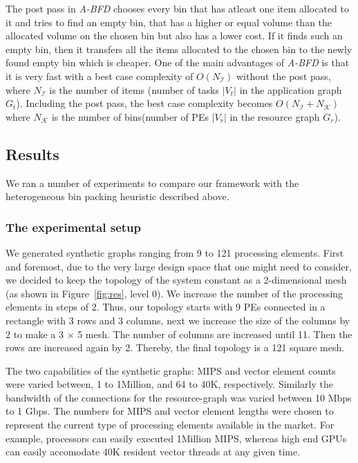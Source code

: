 The post pass in \textit{A-BFD} chooses every bin that has atleast one
item allocated to it and tries to find an empty bin, that has a higher
or equal volume than the allocated volume on the chosen bin but also has
a lower cost. If it finds such an empty bin, then it transfers all the
items allocated to the chosen bin to the newly found empty bin which is
cheaper. One of the main advantages of \textit{A-BFD} is that it is very
fast with a best case complexity of $O(N_\mathcal{I})$ without the post
pass, where $N_\mathcal{I}$ is the number of items (number of tasks
$|V_t|$ in the application graph $G_t$). Including the post pass, the
best case complexity becomes $O(N_\mathcal{I} + N_\mathcal{K})$ where
$N_\mathcal{K}$ is the number of bins(number of PEs $|V_r|$ in the
resource graph $G_r$).


\subsection{Results}
\label{sec:results}

We ran a number of experiments to compare our framework with the
heterogeneous bin packing heuristic described above.

\subsubsection{The experimental setup}
\label{sec:experimental-setup}

We generated synthetic graphs ranging from 9 to 121 processing
elements. First and foremost, due to the very large design space that
one might need to consider, we decided to keep the topology of the
system constant as a 2-dimensional mesh (as shown in
Figure~\ref{fig:res}, level 0). We increase the number of the processing
elements in steps of 2. Thus, our topology starts with 9 PEs connected
in a rectangle with 3 rows and 3 columns, next we increase the size of
the columns by 2 to make a 3 $\times$ 5 mesh. The number of columns are
increased until 11. Then the rows are increased again by 2. Thereby, the
final topology is a 121 square mesh.

The two capabilities of the synthetic graphs: MIPS and vector element
counts were varied between, 1 to 1Million, and 64 to 40K,
respectively. Similarly the bandwidth of the connections for the
resource-graph was varied between 10 Mbps to 1 Gbps. The numbers for
MIPS and vector element lengths were chosen to represent the current
type of processing elements available in the market. For example,
processors can easily executed 1Million MIPS, whereas high end GPUs can
easily accomodate 40K resident vector threads at any given time. 

